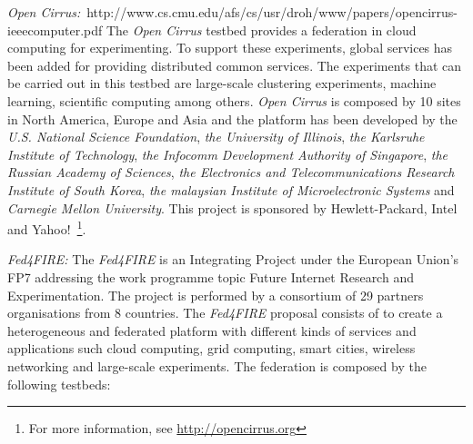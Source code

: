 \emph{Open
  Cirrus:}~{http://www.cs.cmu.edu/afs/cs/usr/droh/www/papers/opencirrus-ieeecomputer.pdf}
The \emph{Open Cirrus} testbed provides a federation in cloud computing for
experimenting. To support these experiments, global services has been added for
providing distributed common services. The experiments that can be carried out
in this testbed are large-scale clustering experiments, machine learning,
scientific computing among others. \emph{Open Cirrus} is composed by 10 sites in North
America, Europe and Asia and the platform has been developed by the
\emph{U.S. National Science Foundation}, \emph{the University of
  Illinois},\emph{ the Karlsruhe Institute of Technology}, \emph{the Infocomm Development Authority of Singapore},\emph{ the
Russian Academy of Sciences}, \emph{the Electronics and Telecommunications Research
Institute of South Korea}, \emph{the malaysian Institute of Microelectronic
  Systems} and \emph{Carnegie Mellon University}. This project is sponsored by Hewlett-Packard, Intel
and Yahoo!~\footnote{For more information, see \url{http://opencirrus.org}}.

\emph{Fed4FIRE:} The \emph{Fed4FIRE} is an Integrating Project under the European
Union's \ac{FP7} addressing the work programme topic Future Internet Research
and Experimentation. The project is performed by a consortium of 29 partners
organisations from 8 countries. The \emph{Fed4FIRE}  proposal consists of to create a
heterogeneous and federated platform with different kinds of services and applications such
cloud computing, grid computing, smart cities, wireless networking and
large-scale experiments. The federation is composed by the following testbeds:

